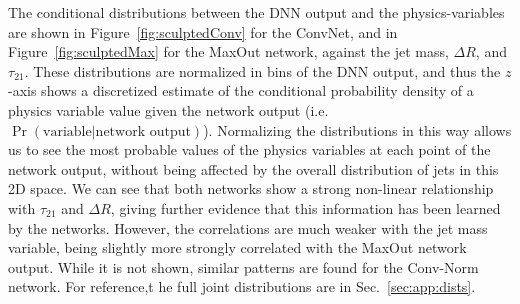 The conditional distributions between the DNN output and the physics-variables are shown in Figure~\ref{fig:sculptedConv} for the ConvNet, and in Figure~\ref{fig:sculptedMax} for the MaxOut network, against the jet mass, $\Delta R$, and $\tau_{21}$.   These distributions are normalized in bins of the DNN output, and thus the $z$-axis shows a discretized estimate of the conditional probability density of a physics variable value given the network output (i.e. $\Pr(\text{variable}|\text{network output})$). Normalizing the distributions in this way allows us to see the most probable values of the physics variables at each point of the network output, without being affected by the overall distribution of jets in this 2D space.  We can see that both networks show a strong non-linear relationship with $\tau_{21}$ and $\Delta R$, giving further evidence that this information has been learned by the networks.  However, the correlations are much weaker with the jet mass variable, being slightly more strongly correlated with the MaxOut network output.  While it is not shown, similar patterns are found for the Conv-Norm network.   For reference,t he full joint distributions are in Sec.~\ref{sec:app:dists}. 
